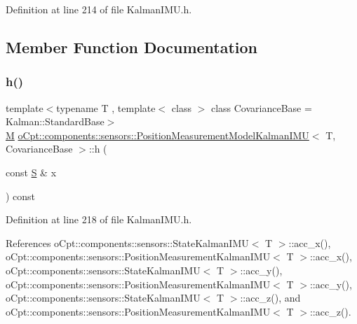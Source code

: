 Definition at line 214 of file Kalman\+I\+M\+U.\+h.



\subsection{Member Function Documentation}
\hypertarget{classo_cpt_1_1components_1_1sensors_1_1_position_measurement_model_kalman_i_m_u_a2cc7f4c711ed5db5d24bd8c936c3195e}{}\label{classo_cpt_1_1components_1_1sensors_1_1_position_measurement_model_kalman_i_m_u_a2cc7f4c711ed5db5d24bd8c936c3195e} 
\subsubsection{\texorpdfstring{h()}{h()}}
{\footnotesize\ttfamily template$<$typename T , template$<$ class $>$ class Covariance\+Base = Kalman\+::\+Standard\+Base$>$ \\
\hyperlink{classo_cpt_1_1components_1_1sensors_1_1_position_measurement_model_kalman_i_m_u_a8bf21cd63d26386aba33fd39299f96bf}{M} \hyperlink{classo_cpt_1_1components_1_1sensors_1_1_position_measurement_model_kalman_i_m_u}{o\+Cpt\+::components\+::sensors\+::\+Position\+Measurement\+Model\+Kalman\+I\+MU}$<$ T, Covariance\+Base $>$\+::h (\begin{DoxyParamCaption}\item[{const \hyperlink{classo_cpt_1_1components_1_1sensors_1_1_position_measurement_model_kalman_i_m_u_a79b139fdb8d4569de9b5082297c3397f}{S} \&}]{x }\end{DoxyParamCaption}) const\hspace{0.3cm}{\ttfamily [inline]}}



Definition at line 218 of file Kalman\+I\+M\+U.\+h.



References o\+Cpt\+::components\+::sensors\+::\+State\+Kalman\+I\+M\+U$<$ T $>$\+::acc\+\_\+x(), o\+Cpt\+::components\+::sensors\+::\+Position\+Measurement\+Kalman\+I\+M\+U$<$ T $>$\+::acc\+\_\+x(), o\+Cpt\+::components\+::sensors\+::\+State\+Kalman\+I\+M\+U$<$ T $>$\+::acc\+\_\+y(), o\+Cpt\+::components\+::sensors\+::\+Position\+Measurement\+Kalman\+I\+M\+U$<$ T $>$\+::acc\+\_\+y(), o\+Cpt\+::components\+::sensors\+::\+State\+Kalman\+I\+M\+U$<$ T $>$\+::acc\+\_\+z(), and o\+Cpt\+::components\+::sensors\+::\+Position\+Measurement\+Kalman\+I\+M\+U$<$ T $>$\+::acc\+\_\+z().

